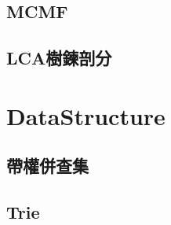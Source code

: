     \subsection{MCMF}
    \subsection{LCA樹鍊剖分}
        

\section{DataStructure}
    \subsection{帶權併查集}
    \subsection{Trie}
